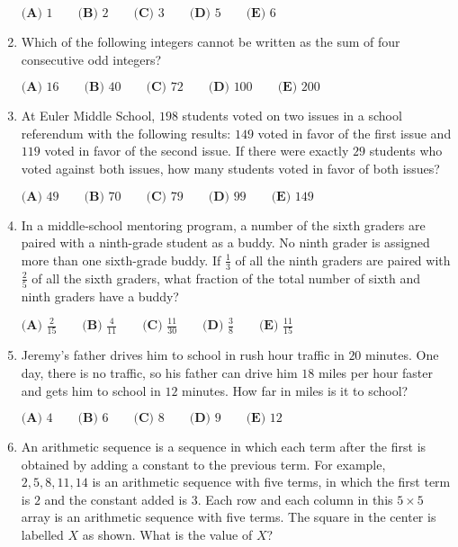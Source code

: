 \documentclass{article}
\begin{document}
\begin{enumerate}[label=\arabic*., itemsep=0.5em]
\(\textbf{(A)}\text{ 1}\qquad\textbf{(B)}\text{ 2}\qquad\textbf{(C)}\text{ 3}\qquad\textbf{(D)}\text{ 5}\qquad\textbf{(E)}\text{ 6}\)\par \vspace{0.5em}\item Which of the following integers cannot be written as the sum of four consecutive odd integers?

\(\textbf{(A)}\text{ 16}\qquad\textbf{(B)}\text{ 40}\qquad\textbf{(C)}\text{ 72}\qquad\textbf{(D)}\text{ 100}\qquad\textbf{(E)}\text{ 200}\)\par \vspace{0.5em}\item At Euler Middle School, \(198\) students voted on two issues in a school referendum with the following results: \(149\) voted in favor of the first issue and \(119\) voted in favor of the second issue. If there were exactly \(29\) students who voted against both issues, how many students voted in favor of both issues?

\(\textbf{(A) }49\qquad\textbf{(B) }70\qquad\textbf{(C) }79\qquad\textbf{(D) }99\qquad \textbf{(E) }149\)\par \vspace{0.5em}\item In a middle-school mentoring program, a number of the sixth graders are paired with a ninth-grade student as a buddy. No ninth grader is assigned more than one sixth-grade buddy. If \(\tfrac{1}{3}\) of all the ninth graders are paired with \(\tfrac{2}{5}\) of all the sixth graders, what fraction of the total number of sixth and ninth graders have a buddy?

\(
\textbf{(A) } \frac{2}{15} \qquad
\textbf{(B) } \frac{4}{11} \qquad
\textbf{(C) } \frac{11}{30} \qquad
\textbf{(D) } \frac{3}{8} \qquad
\textbf{(E) } \frac{11}{15}
\)\par \vspace{0.5em}\item Jeremy's father drives him to school in rush hour traffic in \(20\) minutes. One day, there is no traffic, so his father can drive him \(18\) miles per hour faster and gets him to school in \(12\) minutes. How far in miles is it to school?

\(
\textbf{(A) } 4 \qquad
\textbf{(B) } 6 \qquad
\textbf{(C) } 8 \qquad
\textbf{(D) } 9 \qquad
\textbf{(E) } 12
\)\par \vspace{0.5em}\item An arithmetic sequence is a sequence in which each term after the first is obtained by adding a constant to the previous term. For example, \(2,5,8,11,14\) is an arithmetic sequence with five terms, in which the first term is \(2\) and the constant added is \(3\). Each row and each column in this \(5\times5\) array is an arithmetic sequence with five terms. The square in the center is labelled \(X\) as shown. What is the value of \(X\)?



\end{enumerate}
\end{document}
